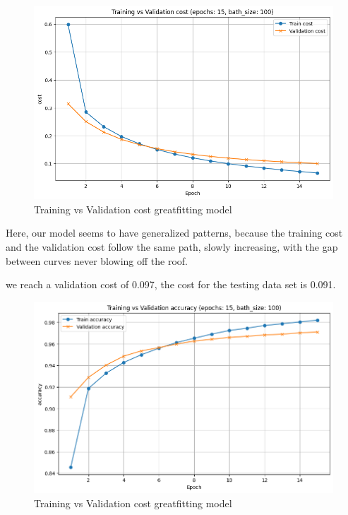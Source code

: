 \documentclass[a4paper, twocolumn, twoside]{article}
\begin{document}
	\begin{figure}[H]
		\begin{center}
			\includegraphics[width=\columnwidth]{images/cost_greatfit.png}
		\end{center}
		\caption{Training vs Validation cost greatfitting model}\label{fig:cost_greatfit}
	\end{figure}

	Here, our model seems to have generalized patterns, because the training cost and 
	the validation cost follow the same path, slowly increasing, with the gap between curves never blowing off the roof.

	we reach a validation cost of 0.097, the cost for the testing data set is 0.091.

	\begin{figure}[H]
		\begin{center}
			\includegraphics[width=\columnwidth]{images/accuracy_greatfit.png}
		\end{center}
		\caption{Training vs Validation cost greatfitting model}\label{fig:accuracy_greatfit}
	\end{figure}
\end{document}
